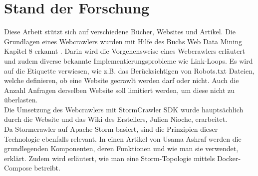 \chapter{Stand der Forschung}
Diese Arbeit stützt sich auf verschiedene Bücher, Websites und Artikel.
Die Grundlagen eines Webcrawlers wurden mit Hilfe des Buchs \glqq Web Data Mining\grqq{} Kapitel 8 erkannt \cite[p. 311ff.]{liu2007web}. 
Darin wird die Vorgehensweise eines Webcrawlers erläutert und zudem diverse bekannte Implementierungsprobleme wie Link-Loops.
Es wird auf die Etiquette verwiesen, wie z.B. das Berücksichtigen von Robots.txt Dateien, welche definieren, ob eine Website gecrawlt werden darf oder nicht\cite[p. 353ff.]{liu2007web}.
Auch die Anzahl Anfragen derselben Website soll limitiert werden, um diese nicht zu überlasten\cite[p. 353ff.]{liu2007web}.\\
Die Umsetzung des Webcrawlers mit StormCrawler SDK wurde hauptsächlich durch die Website\cite{StormCrawler} und das Wiki des Erstellers\cite{GithubStormCrawler}, Julien Nioche, erarbeitet.\\
Da Stormcrawler auf Apache Storm basiert, sind die Prinzipien dieser Technologie ebenfalls relevant.
In einen Artikel von Usama Ashraf werden die grundlegenden Komponenten, deren Funktionen und wie man sie verwendet, erklärt.
Zudem wird erläutert, wie man eine Storm-Topologie mittels Docker-Compose betreibt\cite{ApacheStormDev}.\\

